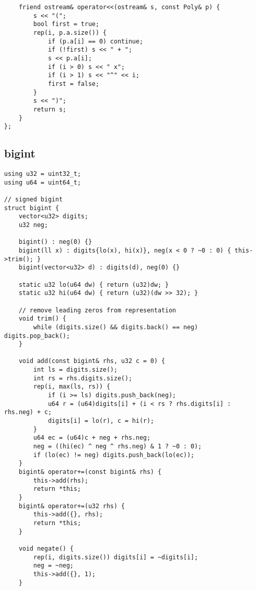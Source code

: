 \documentclass[twoside]{article}
\begin{document}
\begin{multicols*}{2}
\begin{verbatim}
    friend ostream& operator<<(ostream& s, const Poly& p) {
        s << "(";
        bool first = true;
        rep(i, p.a.size()) {
            if (p.a[i] == 0) continue;
            if (!first) s << " + ";
            s << p.a[i];
            if (i > 0) s << " x";
            if (i > 1) s << "^" << i;
            first = false;
        }
        s << ")";
        return s;
    }
};
\end{verbatim}

{
\subsection*{bigint}
}
\begin{verbatim}
using u32 = uint32_t;
using u64 = uint64_t;

// signed bigint
struct bigint {
    vector<u32> digits;
    u32 neg;

    bigint() : neg(0) {}
    bigint(ll x) : digits{lo(x), hi(x)}, neg(x < 0 ? ~0 : 0) { this->trim(); }
    bigint(vector<u32> d) : digits(d), neg(0) {}

    static u32 lo(u64 dw) { return (u32)dw; }
    static u32 hi(u64 dw) { return (u32)(dw >> 32); }

    // remove leading zeros from representation
    void trim() {
        while (digits.size() && digits.back() == neg) digits.pop_back();
    }

    void add(const bigint& rhs, u32 c = 0) {
        int ls = digits.size();
        int rs = rhs.digits.size();
        rep(i, max(ls, rs)) {
            if (i >= ls) digits.push_back(neg);
            u64 r = (u64)digits[i] + (i < rs ? rhs.digits[i] : rhs.neg) + c;
            digits[i] = lo(r), c = hi(r);
        }
        u64 ec = (u64)c + neg + rhs.neg;
        neg = ((hi(ec) ^ neg ^ rhs.neg) & 1 ? ~0 : 0);
        if (lo(ec) != neg) digits.push_back(lo(ec));
    }
    bigint& operator+=(const bigint& rhs) {
        this->add(rhs);
        return *this;
    }
    bigint& operator+=(u32 rhs) {
        this->add({}, rhs);
        return *this;
    }

    void negate() {
        rep(i, digits.size()) digits[i] = ~digits[i];
        neg = ~neg;
        this->add({}, 1);
    }


\end{verbatim}
\end{multicols*}
\end{document}

